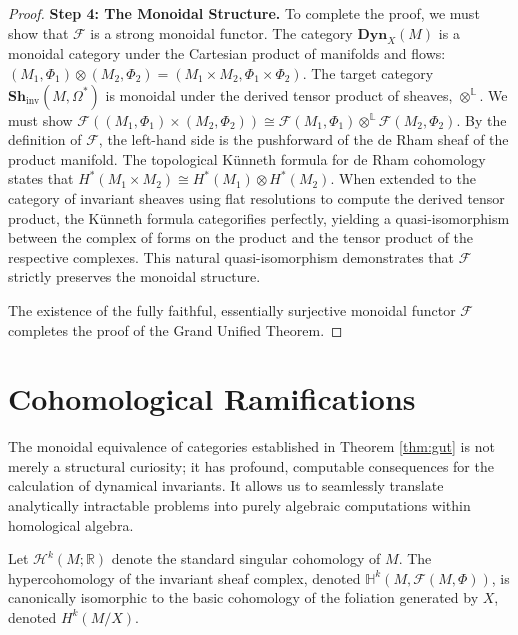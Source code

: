 \begin{proof}
\textbf{Step 4: The Monoidal Structure.}
To complete the proof, we must show that $\mathcal{F}$ is a strong monoidal functor. The category $\mathbf{Dyn}_X(M)$ is a monoidal category under the Cartesian product of manifolds and flows: $(M_1, \Phi_1) \otimes (M_2, \Phi_2) = (M_1 \times M_2, \Phi_1 \times \Phi_2)$. 
The target category $\mathbf{Sh}_{\text{inv}}(M, \Omega^*)$ is monoidal under the derived tensor product of sheaves, $\otimes^{\mathbb{L}}$.
We must show $\mathcal{F}((M_1, \Phi_1) \times (M_2, \Phi_2)) \cong \mathcal{F}(M_1, \Phi_1) \otimes^{\mathbb{L}} \mathcal{F}(M_2, \Phi_2)$. 
By the definition of $\mathcal{F}$, the left-hand side is the pushforward of the de Rham sheaf of the product manifold. The topological Künneth formula for de Rham cohomology states that $H^*(M_1 \times M_2) \cong H^*(M_1) \otimes H^*(M_2)$. When extended to the category of invariant sheaves using flat resolutions to compute the derived tensor product, the Künneth formula categorifies perfectly, yielding a quasi-isomorphism between the complex of forms on the product and the tensor product of the respective complexes. This natural quasi-isomorphism demonstrates that $\mathcal{F}$ strictly preserves the monoidal structure.

The existence of the fully faithful, essentially surjective monoidal functor $\mathcal{F}$ completes the proof of the Grand Unified Theorem.
\end{proof}

\section{Cohomological Ramifications}
\label{sec:ramifications}

The monoidal equivalence of categories established in Theorem \ref{thm:gut} is not merely a structural curiosity; it has profound, computable consequences for the calculation of dynamical invariants. It allows us to seamlessly translate analytically intractable problems into purely algebraic computations within homological algebra.

\begin{theorem}
Let $\mathcal{H}^k(M; \mathbb{R})$ denote the standard singular cohomology of $M$. The hypercohomology of the invariant sheaf complex, denoted $\mathbb{H}^k(M, \mathcal{F}(M, \Phi))$, is canonically isomorphic to the basic cohomology of the foliation generated by $X$, denoted $H^k(M/X)$.
\end{theorem}

